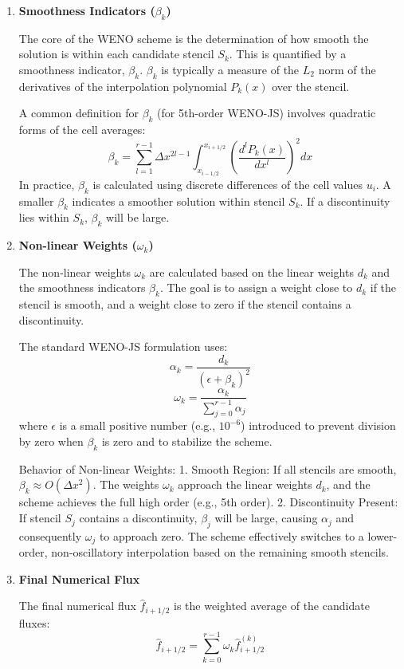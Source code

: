 \documentclass[10pt,a4paper]{article}
\begin{document}
\begin{description}
\begin{description}
\begin{enumerate}
\item \textbf{ Smoothness Indicators ($\beta_k$)}\cite{beta}

The core of the WENO scheme is the determination of how smooth the solution is within each candidate stencil $S_k$. This is quantified by a smoothness indicator, $\beta_k$. $\beta_k$ is typically a measure of the $L_2$ norm of the derivatives of the interpolation polynomial $P_k(x)$ over the stencil.

A common definition for $\beta_k$ (for 5th-order WENO-JS) involves quadratic forms of the cell averages:
$$\beta_k = \sum_{l=1}^{r-1} \Delta x^{2l-1} \int_{x_{i-1/2}}^{x_{i+1/2}} \left(\frac{d^l P_k(x)}{dx^l}\right)^2 dx$$
In practice, $\beta_k$ is calculated using discrete differences of the cell values $u_i$. A smaller $\beta_k$ indicates a smoother solution within stencil $S_k$. If a discontinuity lies within $S_k$, $\beta_k$ will be large.

\item \textbf{Non-linear Weights ($\omega_k$)}

The non-linear weights $\omega_k$ are calculated based on the linear weights $d_k$ and the smoothness indicators $\beta_k$. The goal is to assign a weight close to $d_k$ if the stencil is smooth, and a weight close to zero if the stencil contains a discontinuity.

The standard WENO-JS formulation uses:
$$\alpha_k = \frac{d_k}{(\epsilon + \beta_k)^2}$$
$$\omega_k = \frac{\alpha_k}{\sum_{j=0}^{r-1} \alpha_j}$$
where $\epsilon$ is a small positive number (e.g., $10^{-6}$) introduced to prevent division by zero when $\beta_k$ is zero and to stabilize the scheme.

Behavior of Non-linear Weights:
1.  Smooth Region: If all stencils are smooth, $\beta_k \approx O(\Delta x^2)$. The weights $\omega_k$ approach the linear weights $d_k$, and the scheme achieves the full high order (e.g., 5th order).
2.  Discontinuity Present: If stencil $S_j$ contains a discontinuity, $\beta_j$ will be large, causing $\alpha_j$ and consequently $\omega_j$ to approach zero. The scheme effectively switches to a lower-order, non-oscillatory interpolation based on the remaining smooth stencils.

\item  \textbf{Final Numerical Flux}

The final numerical flux $\hat{f}_{i+1/2}$ is the weighted average of the candidate fluxes:
$$\hat{f}_{i+1/2} = \sum_{k=0}^{r-1} \omega_k \hat{f}_{i+1/2}^{(k)}$$


\end{enumerate}
\end{description}
\end{description}
\end{document}
